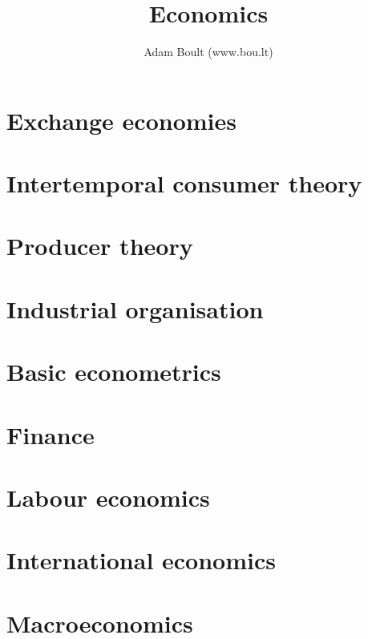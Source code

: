 \documentclass[oneside]{book}
\begin{document}
\author{Adam Boult (www.bou.lt)}
\title{Economics}
\maketitle

\setcounter{tocdepth}{0}
\tableofcontents



\part{Exchange economies}










\part{Intertemporal consumer theory}




\part{Producer theory}









\part{Industrial organisation}







\part{Basic econometrics}






\part{Finance}








\part{Labour economics}



\part{International economics}



\part{Macroeconomics}





\end{document}
